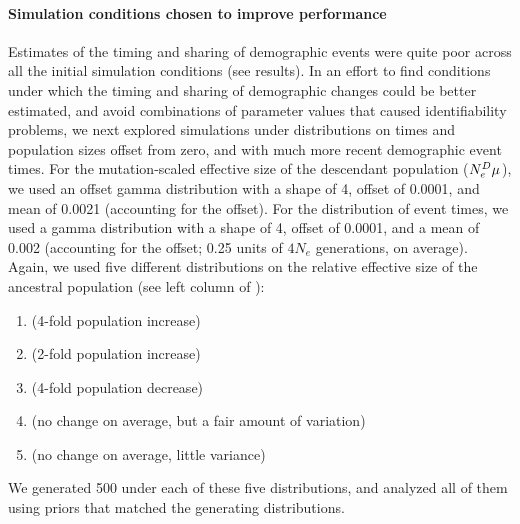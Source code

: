 \paragraph{Simulation conditions chosen to improve performance}

Estimates of the timing and sharing of demographic events were quite poor
across all the initial simulation conditions (see results).
In an effort to find conditions under which the timing and sharing of
demographic changes could be better estimated, and avoid combinations
of parameter values that caused identifiability problems,
we next explored simulations under distributions on times and population sizes
offset from zero, and with much more recent demographic event times.
For the mutation-scaled effective size of the descendant
population
($\epopsize[\descendantpopindex{}]\murate$),
we used an offset gamma distribution with a shape of 4, offset of 0.0001, and
mean of 0.0021 (accounting for the offset).
For the distribution of event times, we used a gamma distribution
with a shape of 4, offset of 0.0001, and a mean of 0.002 (accounting
for the offset; 0.25 units of $4N_e$ generations, on average).
Again, we used five different distributions on the relative effective size of
the ancestral population (see left column of
\figs
{}):
\begin{enumerate}[label=B.\arabic*]
    \item {} (4-fold population increase) \label{sims:optimalFourFoldIncrease}
    \item {} (2-fold population increase)  \label{sims:optimalTwoFoldIncrease}
    \item {} (4-fold population decrease)    \label{sims:optimalFourFoldDecrease}
    \item {} (no change on average, but a fair amount of variation) \label{sims:optimalCenter}
    \item {} (no change on average, little variance) \label{sims:optimalCenterNarrow}
\end{enumerate}
We generated 500 \datasets under each of these five distributions, and analyzed
all of them using priors that matched the generating distributions.

